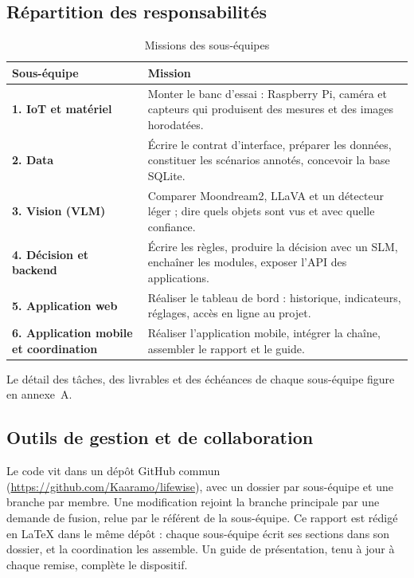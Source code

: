 \subsection{Répartition des responsabilités}

\begin{table}[H]
  \centering
  \small
  \begin{tabularx}{\linewidth}{>{\bfseries}p{4.2cm}X}
    \toprule
    Sous-équipe & Mission \\
    \midrule
    1. IoT et matériel & Monter le banc d'essai : Raspberry Pi, caméra et capteurs qui produisent des mesures et des images horodatées. \\
    2. Data & Écrire le contrat d'interface, préparer les données, constituer les scénarios annotés, concevoir la base SQLite. \\
    3. Vision (VLM) & Comparer Moondream2, LLaVA et un détecteur léger ; dire quels objets sont vus et avec quelle confiance. \\
    4. Décision et backend & Écrire les règles, produire la décision avec un SLM, enchaîner les modules, exposer l'API des applications. \\
    5. Application web & Réaliser le tableau de bord : historique, indicateurs, réglages, accès en ligne au projet. \\
    6. Application mobile et coordination & Réaliser l'application mobile, intégrer la chaîne, assembler le rapport et le guide. \\
    \bottomrule
  \end{tabularx}
  \caption{Missions des sous-équipes}
  \label{tab:missions}
\end{table}

Le détail des tâches, des livrables et des échéances de chaque sous-équipe figure en annexe~A.

\subsection{Outils de gestion et de collaboration}

Le code vit dans un dépôt GitHub commun (\url{https://github.com/Kaaramo/lifewise}), avec un dossier par
sous-équipe et une branche par membre. Une modification rejoint la branche principale par une demande de fusion,
relue par le référent de la sous-équipe. Ce rapport est rédigé en LaTeX dans le même dépôt : chaque sous-équipe
écrit ses sections dans son dossier, et la coordination les assemble. Un guide de présentation, tenu à jour à
chaque remise, complète le dispositif.

